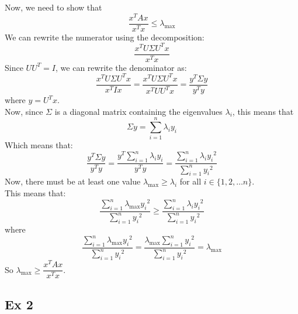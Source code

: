 \documentclass[12pt]{article}
\begin{document}
\begin{enumerate}[label=\alph*)]
        Now, we need to show that
        \[ \dfrac{x^TAx}{x^Tx} 
        \leq \lambda_{\text{max}} \]
        We can rewrite the numerator using the
        decomposition:
        \[ \dfrac{x^TU\Sigma U^Tx}{x^Tx} \]
        Since $UU^T = I$,
        we can rewrite the denominator as:
         \[ \dfrac{x^TU\Sigma U^Tx}{x^TIx} 
        = \dfrac{x^TU\Sigma U^Tx}{x^TUU^Tx}
        = \dfrac{y^T\Sigma y}{y^Ty} \]
        where $y = U^Tx$. \\
        Now, since $\Sigma$ is a diagonal matrix
        containing the eigenvalues $\lambda_i$,
        this means that
        \[ \Sigma y = \sum_{i = 1}^{n}\lambda_i y_i \]
        Which means that:
        \[ \dfrac{y^T\Sigma y}{y^Ty} 
        = \dfrac{y^T \sum_{i = 1}^{n}\lambda_i y_i}{y^Ty} 
        =  \dfrac{\sum_{i = 1}^{n}\lambda_i {y_i}^2}
        {\sum_{i=1}^{n}{y_i}^2} \]
        Now, there must be at least one value
        $\lambda_\text{max} \geq \lambda_i$
        for all $i \in \{1, 2, \dots n\}$. \\
        This means that:
        \[ \dfrac{\sum_{i = 1}^{n}\lambda_\text{max} {y_i}^2}
        {\sum_{i=1}^{n}{y_i}^2} \geq
        \dfrac{\sum_{i = 1}^{n}\lambda_i {y_i}^2}
        {\sum_{i=1}^{n}{y_i}^2} \]
        where
        \[ \dfrac{\sum_{i = 1}^{n}\lambda_\text{max} {y_i}^2}
        {\sum_{i=1}^{n}{y_i}^2} = 
        \dfrac{\lambda_\text{max}\sum_{i = 1}^{n}{y_i}^2}
        {\sum_{i=1}^{n}{y_i}^2} = 
        \lambda_\text{max} \]
        So $\lambda_\text{max} \geq 
        \dfrac{x^TAx}{x^Tx}$. \\
    \end{enumerate}

    \newpage

    \subsection*{Ex 2}
\end{document}
